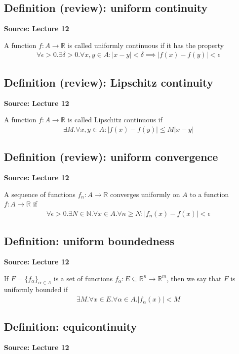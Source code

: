 \documentclass[11pt]{article}
\newcommand{\R}{\mathbb{R}}
\begin{document}
\subsection{Definition (review): uniform continuity}
\textbf{Source: Lecture 12}

A function $f: A \to \R$ is called uniformly continuous if it has the property 
\begin{align*}
    \forall \epsilon > 0. \exists \delta > 0 . \forall x, y \in A : |x-y| < \delta \implies |f(x) - f(y)| < \epsilon 
\end{align*}

\subsection{Definition (review): Lipschitz continuity}
\textbf{Source: Lecture 12}

A function $f: A \to \R$ is called Lipschitz continuous if 
\begin{align*}
    \exists M. \forall x,y \in A : |f(x) - f(y)| \leq M |x-y| 
\end{align*}

\subsection{Definition (review): uniform convergence }
\textbf{Source: Lecture 12}

A sequence of functions $f_n: A \to \R$ converges uniformly on $A$ to a function $f: A \to \R$ if 
\begin{align*}
    \forall \epsilon > 0 . \exists N \in \mathbb{N}. \forall x \in A . \forall n \geq N: |f_n(x) - f(x)|< \epsilon
\end{align*}

\subsection{Definition: uniform boundedness}
\textbf{Source: Lecture 12}

If $F = \{f_\alpha\}_{\alpha \in A}$ is a set of functions $f_\alpha: E \subseteq \R^n \to \R^m$, then we say that $F$ is uniformly bounded if 
\begin{align*}
    \exists M.\forall x \in E.\forall \alpha \in A.|f_\alpha (x)| < M
\end{align*}

\subsection{Definition: equicontinuity}
\textbf{Source: Lecture 12}
\end{document}
